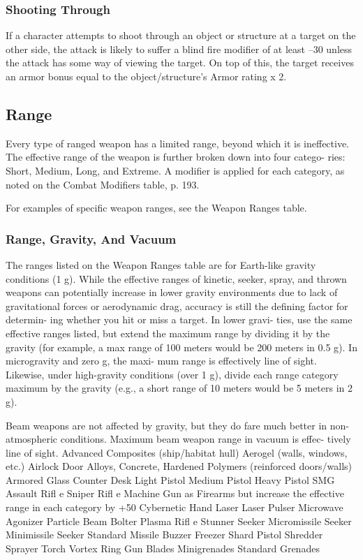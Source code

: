 \subsubsection{Shooting Through}

If a character attempts to shoot through an object or 
structure at a target on the other side, the attack is 
likely to suffer a blind fire modifier of at least –30 
unless the attack has some way of viewing the target. 
On top of this, the target receives an armor bonus 
equal to the object/structure's Armor rating x 2.

\subsection{Range}

Every type of ranged weapon has a limited range, 
beyond which it is ineffective. The effective range of 
the weapon is further broken down into four catego-
ries: Short, Medium, Long, and Extreme. A modifier 
is applied for each category, as noted on the Combat 
Modifiers table, p. 193.

For examples of specific weapon ranges, see the 
Weapon Ranges table.

\subsubsection{Range, Gravity, And Vacuum}

The ranges listed on the Weapon Ranges table are for 
Earth-like gravity conditions (1 g). While the effective 
ranges of kinetic, seeker, spray, and thrown weapons 
can potentially increase in lower gravity environments 
due to lack of gravitational forces or aerodynamic 
drag, accuracy is still the defining factor for determin-
ing whether you hit or miss a target. In lower gravi-
ties, use the same effective ranges listed, but extend 
the maximum range by dividing it by the gravity (for 
example, a max range of 100 meters would be 200 
meters in 0.5 g). In microgravity and zero g, the maxi-
mum range is effectively line of sight. Likewise, under 
high-gravity conditions (over 1 g), divide each range 
category maximum by the gravity (e.g., a short range 
of 10 meters would be 5 meters in 2 g).

Beam weapons are not affected by gravity, but they 
do fare much better in non-atmospheric conditions. 
Maximum beam weapon range in vacuum is effec-
tively line of sight.
Advanced Composites 
(ship/habitat hull)
Aerogel (walls, windows, etc.)
Airlock Door
Alloys, Concrete, Hardened Polymers 
(reinforced doors/walls)
Armored Glass
Counter
Desk
Light Pistol
Medium Pistol
Heavy Pistol
SMG
Assault Riﬂ e
Sniper Riﬂ e
Machine Gun
as Firearms but increase the effective range in each category by +50%
Cybernetic Hand Laser
Laser Pulser
Microwave Agonizer
Particle Beam Bolter
Plasma Riﬂ e
Stunner
Seeker Micromissile
Seeker Minimissile
Seeker Standard Missile
Buzzer
Freezer
Shard Pistol
Shredder
Sprayer
Torch
Vortex Ring Gun
Blades
Minigrenades
Standard Grenades

